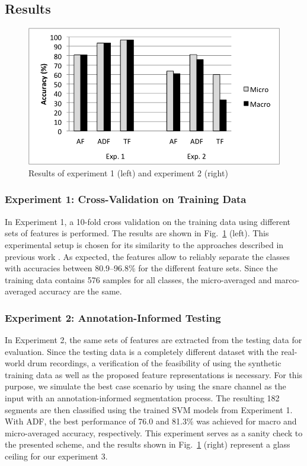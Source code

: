 \documentclass{article}
\begin{document}
\subsection{Results}\label{ssec:results}
\begin{figure}
\centering
\includegraphics[width = 8.0 cm]{./figures/exp1_exp2.png}
\caption{Results of experiment 1 (left) and experiment 2 (right)}
\label{fig:exp1n2}
\end{figure}

\subsubsection{Experiment 1: Cross-Validation on Training Data}\label{sssec:exp1}
In Experiment 1, a 10-fold cross validation on the training data using different sets of features is performed. The results are shown in Fig.~\ref{fig:exp1n2} (left). This experimental setup is chosen for its similarity to the approaches described in previous work \cite{Tindale2004, Prockup2013}. As expected, the features allow to reliably separate the classes with accuracies between 80.9--96.8\% for the different feature sets. Since the training data contains 576 samples for all classes, the micro-averaged and marco-averaged accuracy are the same.

\subsubsection{Experiment 2: Annotation-Informed Testing}\label{sssec:exp2}
In Experiment 2, the same sets of features are extracted from the testing data for evaluation. Since the testing data is a completely different dataset with the real-world drum recordings, a verification of the feasibility of using the synthetic training data as well as the proposed feature representations is necessary. For this purpose, we simulate the best case scenario by using the snare channel as the input with an annotation-informed segmentation process. The resulting 182 segments are then classified using the trained SVM models from Experiment 1. With ADF, the best performance of 76.0 and 81.3\% was achieved for macro and micro-averaged accuracy, respectively. This experiment serves as a sanity check to the presented scheme, and the results shown in Fig.~\ref{fig:exp1n2} (right) represent a glass ceiling for our experiment 3.
\end{document}
